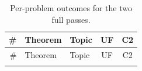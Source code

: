 \documentclass[12pt, a4paper]{article}
\begin{document}
\begingroup\footnotesize
\setlength{\tabcolsep}{4pt}
\begin{longtable}{@{}rllcc@{}}
\caption{Per-problem outcomes for the two full passes.}
\label{tab:allitems}\\
\toprule
\# & Theorem & Topic & UF & C2 \\
\midrule
\endfirsthead
\toprule
\# & Theorem & Topic & UF & C2 \\
\midrule
\endhead
\bottomrule
\endfoot

\end{longtable}
\endgroup
\end{document}
